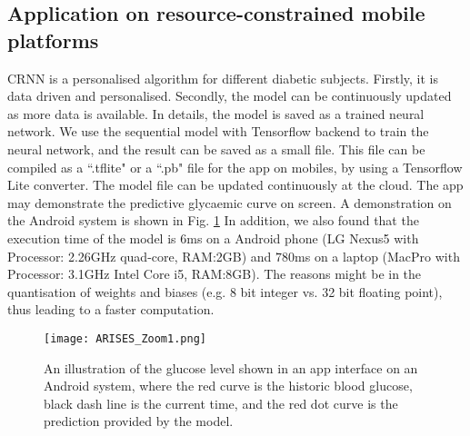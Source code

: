 \documentclass[a4paper, 10 pt, twocolumn]{IEEEtran}
\begin{document}
%
\subsection{ {Application on resource-constrained mobile platforms}}
CRNN is a personalised algorithm for different diabetic subjects. Firstly, it is data driven and personalised. Secondly, the model can be continuously updated as more data is available. In details, the model is saved as a
trained neural network. We use the sequential model with Tensorflow backend to train the neural network, and the result can be saved as a small file. {This file can be compiled as a ``.tflite" or a ``.pb" file for the app
on mobiles, by using a Tensorflow Lite converter. The model file can be updated continuously at the cloud.} The app may demonstrate the predictive glycaemic curve on screen. A demonstration on the Android system is shown
in Fig. \ref{fig_E} In addition, we also found that the execution time of the model is $6$ms on a Android phone (LG Nexus5 with Processor: 2.26GHz quad-core, RAM:2GB) and $780$ms on a laptop (MacPro with Processor: 3.1GHz
Intel Core i5, RAM:8GB). The reasons might be in the quantisation of weights and biases (e.g. 8 bit integer vs. 32 bit floating point), thus leading to a faster computation.

\begin{figure}[!ht]
     \centering
            \texttt{[image: ARISES\_Zoom1.png]}
             \caption{An illustration of the glucose level shown in an app interface on an Android system, where the red curve is the historic blood glucose, black dash line is the current time, and the red dot curve is
             the prediction provided by the model.}\label{fig_E}
\end{figure}
\end{document}
